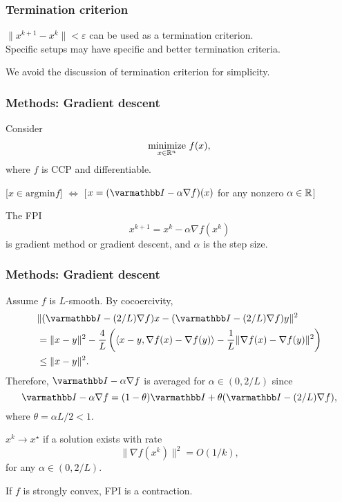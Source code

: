 \documentclass[10pt,mathserif]{beamer}
\begin{document}
\begin{frame}
\frametitle{Termination criterion}

$\|x^{k+1}-x^k\|<\varepsilon$ can be used as a termination criterion.\\
Specific setups may have specific and better termination criteria.

\vspace{0.2in}

We avoid the discussion of termination criterion for simplicity.
\end{frame}


\begin{frame}
\frametitle{Methods: Gradient descent}
Consider
\[
\underset{x\in \mathbb{R}^n}{\mbox{minimize}}~f(x),
\]
where $f$ is CCP and differentiable.

\vspace{0.2in}
[$x\in \mathrm{argmin} f$]
$\Leftrightarrow $
[$x=(\opI -\alpha \nabla f)(x)$ for any nonzero $\alpha\in \mathbb{R}$]

\vspace{0.2in}

The FPI
\[
x^{k+1}=x^k-\alpha \nabla f(x^k)
\]
is gradient method or gradient descent, and $\alpha$ is the step size.
\end{frame}

\begin{frame}
\frametitle{Methods: Gradient descent}
Assume $f$ is $L$-smooth. By cocoercivity,
\begin{align*}
&\|(\opI -(2/L)\nabla f)x-(\opI -(2/L)\nabla f)y\|^2\\
&=
\|x-y\|^2-\frac{4}{L}
\left(\langle x-y,\nabla f(x)-\nabla f(y)\rangle-
\frac{1}{L}\|\nabla f(x)-\nabla f(y)\|^2 \right)\\
&\le
\|x-y\|^2.
\end{align*}
Therefore, $\opI -\alpha\nabla f$ is
averaged for $\alpha\in(0,2/L)$ since
\[
\opI -\alpha \nabla f=
(1-\theta)\opI
+\theta(\opI -(2/L) \nabla f),
\]
where $\theta=\alpha L/2<1$.

\vspace{0.2in}

$x^k\rightarrow x^\star$ if a solution exists with rate
\[
\|\nabla f(x^k)\|^2=O(1/k),
\]
for any $\alpha\in(0,2/L)$.

\vspace{0.2in}
If $f$ is strongly convex, FPI is a contraction.
\end{frame}
\end{document}
